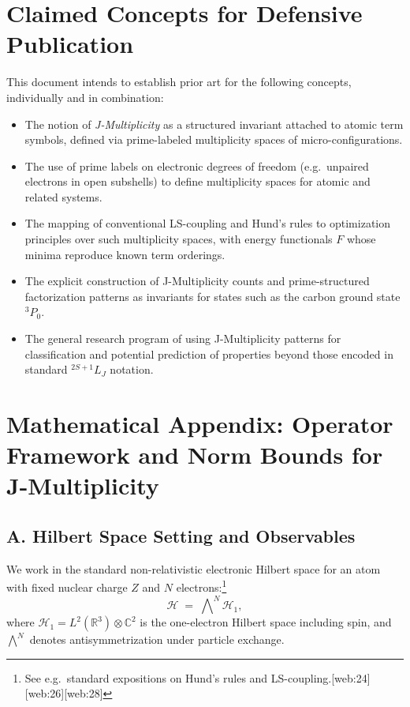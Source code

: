 \documentclass[11pt]{article}
\begin{document}
\section{Claimed Concepts for Defensive Publication}

This document intends to establish prior art for the following concepts, individually and in combination:
\begin{itemize}
  \item The notion of \emph{J-Multiplicity} as a structured invariant attached to atomic term symbols, defined via prime-labeled multiplicity spaces of micro-configurations.
  \item The use of prime labels on electronic degrees of freedom (e.g.\ unpaired electrons in open subshells) to define multiplicity spaces for atomic and related systems.
  \item The mapping of conventional LS-coupling and Hund's rules to optimization principles over such multiplicity spaces, with energy functionals \(F\) whose minima reproduce known term orderings.
  \item The explicit construction of J-Multiplicity counts and prime-structured factorization patterns as invariants for states such as the carbon ground state \(^{3}P_0\).
  \item The general research program of using J-Multiplicity patterns for classification and potential prediction of properties beyond those encoded in standard \(^{2S+1}L_J\) notation.
\end{itemize}

\section*{Mathematical Appendix: Operator Framework and Norm Bounds for J-Multiplicity}

\subsection*{A. Hilbert Space Setting and Observables}

We work in the standard non-relativistic electronic Hilbert space for an atom with fixed nuclear charge \(Z\) and \(N\) electrons:\footnote{See e.g.\ standard expositions on Hund's rules and LS-coupling.[web:24][web:26][web:28]}
\[
\mathcal{H} \;=\; \bigwedge\nolimits^N \mathcal{H}_1,
\]
where \(\mathcal{H}_1 = L^2(\mathbb{R}^3) \otimes \mathbb{C}^2\) is the one-electron Hilbert space including spin, and \(\bigwedge^N\) denotes antisymmetrization under particle exchange.
\end{document}
